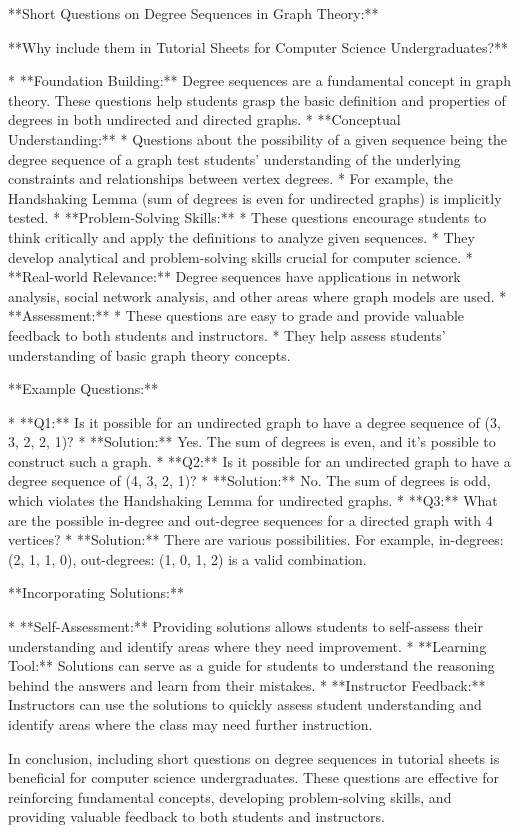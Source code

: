 **Short Questions on Degree Sequences in Graph Theory:**

**Why include them in Tutorial Sheets for Computer Science Undergraduates?**

* **Foundation Building:** Degree sequences are a fundamental concept in graph theory. These questions help students grasp the basic definition and properties of degrees in both undirected and directed graphs.
* **Conceptual Understanding:** 
    * Questions about the possibility of a given sequence being the degree sequence of a graph test students' understanding of the underlying constraints and relationships between vertex degrees. 
    * For example, the Handshaking Lemma (sum of degrees is even for undirected graphs) is implicitly tested.
* **Problem-Solving Skills:** 
    * These questions encourage students to think critically and apply the definitions to analyze given sequences. 
    * They develop analytical and problem-solving skills crucial for computer science.
* **Real-world Relevance:** Degree sequences have applications in network analysis, social network analysis, and other areas where graph models are used.
* **Assessment:** 
    * These questions are easy to grade and provide valuable feedback to both students and instructors. 
    * They help assess students' understanding of basic graph theory concepts.

**Example Questions:**

* **Q1:** Is it possible for an undirected graph to have a degree sequence of (3, 3, 2, 2, 1)? 
    * **Solution:** Yes. The sum of degrees is even, and it's possible to construct such a graph.
* **Q2:** Is it possible for an undirected graph to have a degree sequence of (4, 3, 2, 1)?
    * **Solution:** No. The sum of degrees is odd, which violates the Handshaking Lemma for undirected graphs.
* **Q3:** What are the possible in-degree and out-degree sequences for a directed graph with 4 vertices? 
    * **Solution:** There are various possibilities. For example, in-degrees: (2, 1, 1, 0), out-degrees: (1, 0, 1, 2) is a valid combination.

**Incorporating Solutions:**

* **Self-Assessment:** Providing solutions allows students to self-assess their understanding and identify areas where they need improvement.
* **Learning Tool:** Solutions can serve as a guide for students to understand the reasoning behind the answers and learn from their mistakes.
* **Instructor Feedback:** Instructors can use the solutions to quickly assess student understanding and identify areas where the class may need further instruction.

In conclusion, including short questions on degree sequences in tutorial sheets is beneficial for computer science undergraduates. These questions are effective for reinforcing fundamental concepts, developing problem-solving skills, and providing valuable feedback to both students and instructors.
